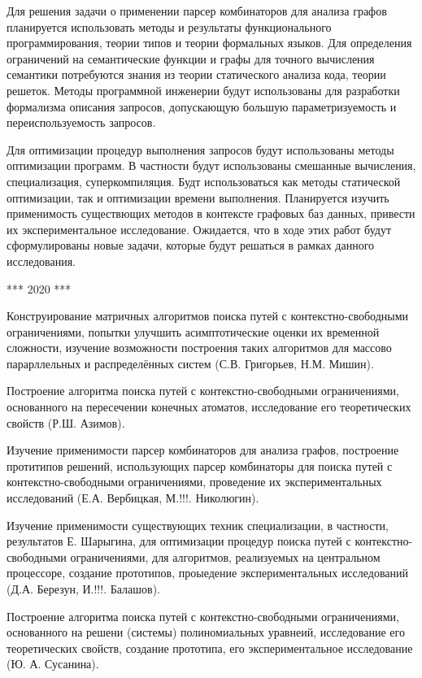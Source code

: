 \documentclass[12pt]{article}  %
\theoremstyle{remark}
\begin{document}
Для решения задачи о применении парсер комбинаторов для анализа графов планируется использовать методы и результаты функционального программирования, теории типов и теории формальных языков.
Для определения ограничений на семантические функции и графы для точного вычисления семантики потребуются знания из теории статического анализа кода, теории решеток.
Методы программной инженерии будут использованы для разработки формализма описания запросов, допускающую большую параметризуемость и переиспользуемость запросов.

Для оптимизации процедур выполнения запросов будут использованы методы оптимизации программ. В частности будут использованы смешанные вычисления, специализация, суперкомпиляция. Будт использоваться как методы статической оптимизации, так и оптимизации времени выполнения. Планируется изучить применимость существющих методов в контексте графовых баз данных, привести их экспериментальное исследование. Ожидается, что в ходе этих работ будут сформулированы новые задачи, которые будут решаться в рамках данного исследования.

*** 2020 ***

Конструирование матричных алгоритмов поиска путей с контекстно-свободными ограничениями, попытки улучшить асимптотические оценки их временной сложности, изучение возможности построения таких алгоритмов для массово парарллельных и распределённых систем (С.В. Григорьев, Н.М. Мишин).

Построение алгоритма поиска путей с контекстно-свободными ограничениями, основанного на пересечении конечных атоматов, исследование его теоретических свойств (Р.Ш. Азимов).

Изучение применимости парсер комбинаторов для анализа графов, построение протитипов решений, использующих парсер комбинаторы для поиска путей с контекстно-свободными ограничениями, проведение их экспериментальных исследований (Е.А. Вербицкая, М.!!!. Николюгин).

Изучение применимости существующих техник специализации, в частности, результатов Е. Шарыгина, для оптимизации процедур поиска путей с контекстно-свободными ограничениями, для алгоритмов, реализуемых на центральном процессоре, создание прототипов, проыедение экспериментальных исследований (Д.А. Березун, И.!!!. Балашов).

Построение алгоритма поиска путей с контекстно-свободными ограничениями, основанного на решени (системы) полиномиальных уравнеий, исследование его теоретических свойств, создание прототипа, его экспериментальное исследование (Ю. А. Сусанина).
\end{document}
